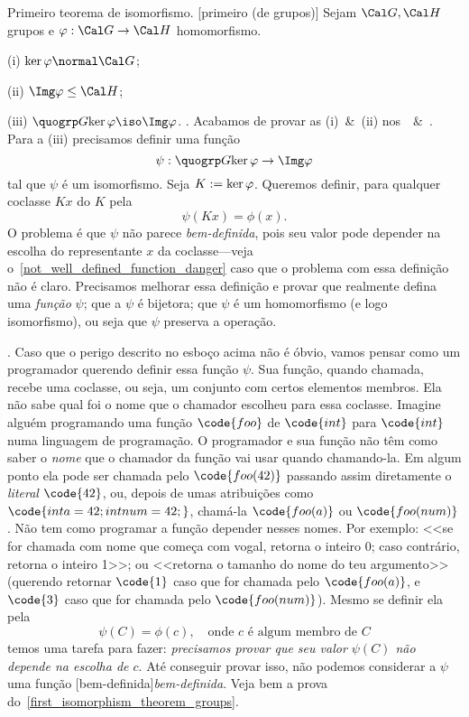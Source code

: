 \theorem Primeiro teorema de isomorfismo.
\label{first_isomorphism_theorem_groups}%
%
[primeiro (de grupos)]%
%
Sejam $\cal G, \cal H$ grupos e $\phi : \cal G \to \cal H$ homomorfismo.
\item{\rm (i)} $\ker\phi\normal \cal G$;
\item{\rm (ii)} $\Img\phi\subgrp \cal H$;
\item{\rm (iii)} $\quogrp G {\ker\phi} \iso \Img\phi$.
\sketch.
Acabamos de provar as (i)~\&~(ii) nos~~\&~.
Para a (iii) precisamos definir uma função
$$
\psi : \quogrp G {\ker\phi} \to \Img\phi
$$
tal que $\psi$ é um isomorfismo.
Seja $K \mathrel{:=} \ker\varphi$.
Queremos definir, para qualquer coclasse $Kx$ do $K$ pela
$$
\psi(Kx) = \phi(x).
$$
O problema é que $\psi$ não parece \emph{bem-definida}, pois seu valor
pode depender na escolha do representante $x$ da coclasse---veja
o~\ref{not_well_defined_function_danger} caso que o problema
com essa definição não é claro.
Precisamos melhorar essa definição e provar que realmente defina
uma \emph{função} $\psi$; que a $\psi$ é bijetora; que $\psi$ é
um homomorfismo (e logo isomorfismo), ou seja que $\psi$ preserva
a operação.
\qes

\beware.
\label{not_well_defined_function_danger}%
Caso que o perigo descrito no esboço acima não é óbvio, vamos
pensar como um programador querendo definir essa função $\psi$.
Sua função, quando chamada, recebe uma coclasse, ou seja,
um conjunto com certos elementos membros.
Ela não sabe qual foi o nome que o chamador escolheu para essa
coclasse.
Imagine alguém programando uma função $\code{foo}$
de $\code{int}$ para $\code{int}$ numa linguagem de programação.
O programador e sua função não têm como saber o \emph{nome}
que o chamador da função vai usar quando chamando-la.
Em algum ponto ela pode ser chamada pelo $\code{foo(42)}$
passando assim diretamente o \emph{literal} $\code{42}$,
ou, depois de umas atribuições como $\code{int a = 42; int num = 42;}$,
chamá-la $\code{foo(a)}$ ou $\code{foo(num)}$.
Não tem como programar a função depender nesses nomes.
Por exemplo:
<<se for chamada com nome que começa com vogal, retorna o inteiro 0;
caso contrário, retorna o inteiro 1>>;
ou
<<retorna o tamanho do nome do teu argumento>>
(querendo retornar $\code{1}$ caso que for chamada pelo $\code{foo(a)}$,
e $\code{3}$ caso que for chamada pelo $\code{foo(num)}$).
\endgraf
Mesmo se definir ela pela
$$
\psi(C) = \phi(c),\quad
\text{onde $c$ é algum membro de $C$}
$$
temos uma tarefa para fazer:
\emph{precisamos provar que seu valor $\psi(C)$ não depende na escolha de $c$}.
Até conseguir provar isso, não podemos considerar a $\psi$ uma função
[bem-definida]\emph{bem-definida}.
Veja bem a prova do~\ref{first_isomorphism_theorem_groups}.

